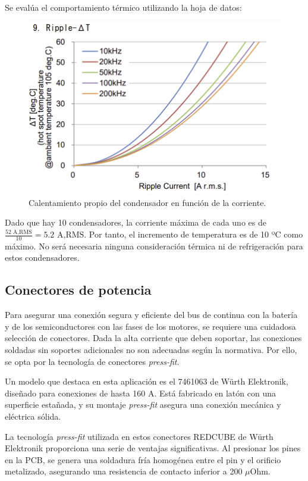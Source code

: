 Se evalúa el comportamiento térmico utilizando la hoja de datos:
\begin{figure}[H]
	\centering
	\includegraphics[width=0.7\linewidth]{fig/dc-link-temp}
	\caption{Calentamiento propio del condensador en función de la corriente.}
\end{figure}

Dado que hay 10 condensadores, la corriente máxima de cada uno es de $\frac{52 \text{ A,RMS}}{10} = 5.2 \text{ A,RMS}$. Por tanto, el incremento de temperatura es de 10 ºC como máximo. No será necesaria ninguna consideración térmica ni de refrigeración para estos condensadores.

\subsection{Conectores de potencia}

Para asegurar una conexión segura y eficiente del bus de continua con la batería y de los semiconductores con las fases de los motores, se requiere una cuidadosa selección de conectores. Dada la alta corriente que deben soportar, las conexiones soldadas sin soportes adicionales no son adecuadas según la normativa. Por ello, se opta por la tecnología de conectores \textit{press-fit}.

Un modelo que destaca en esta aplicación es el 7461063 de Würth Elektronik, diseñado para conexiones de hasta 160 A. Está fabricado en latón con una superficie estañada, y su montaje \textit{press-fit} asegura una conexión mecánica y eléctrica sólida.

La tecnología \textit{press-fit} utilizada en estos conectores REDCUBE de Würth Elektronik proporciona una serie de ventajas significativas. Al presionar los pines en la PCB, se genera una soldadura fría homogénea entre el pin y el orificio metalizado, asegurando una resistencia de contacto inferior a 200 $\mu$Ohm.

